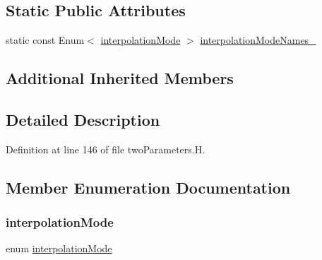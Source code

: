 \subsection*{Static Public Attributes}
\begin{DoxyCompactItemize}
\item 
static const Enum$<$ \hyperlink{classFoam_1_1regimeMapModels_1_1twoParameters_afe565d09517c0dde1ad7c89017837d93}{interpolation\+Mode} $>$ \hyperlink{classFoam_1_1regimeMapModels_1_1twoParameters_ab27551eebb91a2b0df3dd4e5a743894c}{interpolation\+Mode\+Names\+\_\+}
\end{DoxyCompactItemize}
\subsection*{Additional Inherited Members}


\subsection{Detailed Description}


Definition at line 146 of file two\+Parameters.\+H.



\subsection{Member Enumeration Documentation}
\mbox{\label{classFoam_1_1regimeMapModels_1_1twoParameters_afe565d09517c0dde1ad7c89017837d93}} 
\subsubsection{\texorpdfstring{interpolation\+Mode}{interpolationMode}}
{\footnotesize\ttfamily enum \hyperlink{classFoam_1_1regimeMapModels_1_1twoParameters_afe565d09517c0dde1ad7c89017837d93}{interpolation\+Mode}\hspace{0.3cm}{\ttfamily [strong]}}

